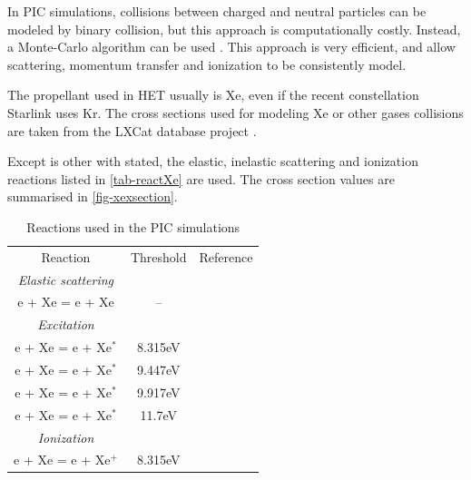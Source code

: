 In \ac{PIC} simulations, collisions between charged and neutral particles can be modeled by binary collision, but this approach is computationally costly.
Instead, a Monte-Carlo algorithm can be used \cite{vahedi1995}.
This approach is very efficient, and allow scattering, momentum transfer and ionization to be consistently model.

The propellant used in \ac{HET} usually is \ac{Xe}, even if the recent constellation Starlink uses \ac{Kr}.
The cross sections used for modeling \ac{Xe} or other gases collisions are taken from the {\sc LXCat} database project \cite{LXCat_web}.

Except is other with stated, the elastic, inelastic scattering and ionization reactions listed in \vref{tab-reactXe} are used.
The cross section values are summarised in \cref{fig-xexsection}.

\begin{table}[hbtp]
  \centering
  \caption{Reactions used in the PIC simulations}
  \label{tab-reactXe}
  \begin{tabular}{ccc}
    Reaction & Threshold & Reference\\
    {\it Elastic scattering} & &\\
    e + Xe = e + Xe   & --   & \cite{Lxcat_Xe,Lxcat_Xe2} \\
    {\it Excitation} & &\\
    e + Xe = e + Xe$^*$   & 8.315eV   & \cite{Lxcat_Xe,Lxcat_Xe2} \\
    e + Xe = e + Xe$^*$   & 9.447eV   & \cite{Lxcat_Xe,Lxcat_Xe2} \\
    e + Xe = e + Xe$^*$   & 9.917eV   & \cite{Lxcat_Xe,Lxcat_Xe2} \\
    e + Xe = e + Xe$^*$   & 11.7eV    & \cite{Lxcat_Xe,Lxcat_Xe2} \\
    {\it Ionization} & &\\
    e + Xe = e + Xe$^+$   & 8.315eV   & \cite{Lxcat_Xe,Lxcat_Xe2} \\

  \end{tabular}

\end{table}


